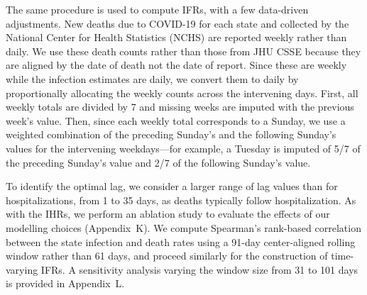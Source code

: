 The same procedure is used to compute IFRs, with a few data-driven adjustments.
New deaths due to COVID-19 for each state and collected by the National Center
for Health Statistics (NCHS) are reported weekly rather than daily. We use these
death counts rather than those from JHU CSSE because they are aligned by the
date of death not the date of report. Since these are weekly while the infection
estimates are daily, we convert them to daily by proportionally allocating the
weekly counts across the intervening days. First, all weekly totals are divided
by 7 and missing weeks are imputed with the previous week's value. Then, since
each weekly total corresponds to a Sunday, we use a weighted combination of the
preceding Sunday's and the following Sunday's values for the intervening
weekdays---for example, a Tuesday is imputed of 5/7 of the preceding Sunday's
value and 2/7 of the following Sunday's value.

To identify the optimal lag, we consider a larger range of lag values than for
hospitalizations, from 1 to 35 days, as deaths typically follow hospitalization.
As with the IHRs, we perform an ablation study to evaluate the effects of our
modelling choices (Appendix~K). We compute Spearman's rank-based correlation
between the state infection and death rates using a 91-day center-aligned
rolling window rather than 61 days, and proceed similarly for the construction
of time-varying IFRs. A sensitivity analysis varying the window size from 31 to
101 days is provided in Appendix~L. 
